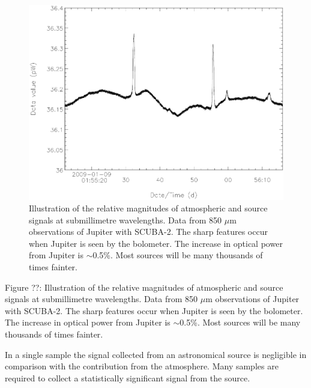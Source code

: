 \documentclass[twoside,11pt]{article}
\newcommand{\htmladdimg}[1]{}
\newenvironment{latexonly}{}{}
\renewcommand{\_}{\texttt{\symbol{95}}}
\begin{document}
\begin{latexonly}
   \begin{figure}[hbt]
   \begin{center}
     \includegraphics[width=150mm]{sun258_submmsignal}
     \caption{Illustration of the relative magnitudes of atmospheric
       and source signals at submillimetre wavelengths. Data from 850
       $\mu$m observations of Jupiter with SCUBA-2. The sharp features
       occur when Jupiter is seen by the bolometer. The increase in
       optical power from Jupiter is $\sim$0.5\%. Most sources will be
       many thousands of times fainter.}
     \label{fig:signal}
   \end{center}
   \end{figure}
\end{latexonly}
\begin{htmlonly}
   \label{fig:signal}
   \htmladdimg{sun258_submmsignal.gif}

   Figure ??: Illustration of the relative magnitudes of atmospheric
   and source signals at submillimetre wavelengths. Data from 850
   $\mu$m observations of Jupiter with SCUBA-2. The sharp features
   occur when Jupiter is seen by the bolometer. The increase in
   optical power from Jupiter is $\sim$0.5\%. Most sources will be
   many thousands of times fainter.

\end{htmlonly}

In a single sample the signal collected from an astronomical source is
negligible in comparison with the contribution from the
atmosphere. Many samples are required to collect a statistically
significant signal from the source. 
\end{document}
